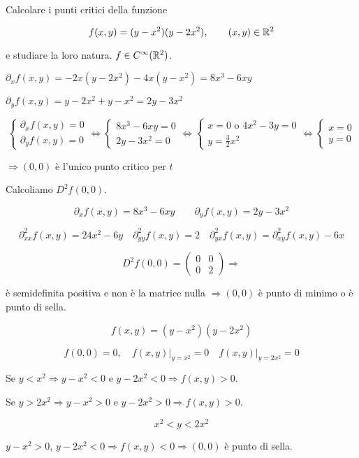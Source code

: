\begin{exbar}
\begin{example}
	Calcolare i punti critici della funzione 
	
	$$f(x,y)=(y-x^2)(y-2x^2), \qquad (x,y) \in \mathbb{R}^2$$
	
	e studiare la loro natura. $f\in C^\infty (\mathbb{R}^2)$.
	
	$\partial_xf(x,y)=-2x(y-2x^2)-4x(y-x^2)=8x^3-6xy$
	
	$\partial_yf(x,y)=y-2x^2+y-x^2=2y-3x^2$
	
	$$\begin{cases}
		\partial_xf(x,y)=0\\
		\partial_yf(x,y)=0
	\end{cases} \Leftrightarrow 
	\begin{cases}
		8x^3-6xy=0\\
		2y-3x^2=0
	\end{cases} \Leftrightarrow 
	\begin{cases}
		x=0 \text{   o   } 4x^2-3y=0\\
		y=\frac{3}{2}x^2
	\end{cases}\Leftrightarrow 
	\begin{cases}
		x=0\\
		y=0
	\end{cases}$$
	
	$\Rightarrow(0,0)$ è l'unico punto critico per $t$
	
	Calcoliamo $D^2f(0,0)$.
	
	$$\partial_x f(x,y) = 8x^3-6xy \qquad \partial_y f(x,y) = 2y-3x^2$$
	
	$$\partial_{xx}^2f(x,y)=24x^2-6y \quad \partial_{yy}^2f(x,y)=2 \quad \partial_{yx}^2f(x,y)=\partial_{xy}^2f(x,y)-6x$$
	
	$$D^2f(0,0)=\begin{pmatrix}
		0&0\\
		0&2
	\end{pmatrix} \Rightarrow$$
	
	è semidefinita positiva e non è la matrice nulla $\Rightarrow (0,0)$ è punto di minimo o è punto di sella.
	
	$$f(x,y)=(y-x^2)(y-2x^2)$$
	
	$$f(0,0)=0, \quad f(x,y) \big|_{y=x^2}=0 \quad f(x,y)\big|_{y=2x^2}=0$$
	
	\segnaposto %

	Se $y < x^2 \Rightarrow y-x^2 < 0$ e $y-2x^2< 0 \Rightarrow f(x,y)>0$. 
	
	Se $y > 2x^2 \Rightarrow y-x^2 >0$ e $y-2x^2 >0 \Rightarrow f(x,y)> 0$.
	
	$$x^2< y< 2x^2$$
	
	$y- x^2>0$, $y-2x^2< 0 \Rightarrow f(x,y)<0 \Rightarrow (0,0)$ è punto di sella.
\end{example}
\end{exbar}


